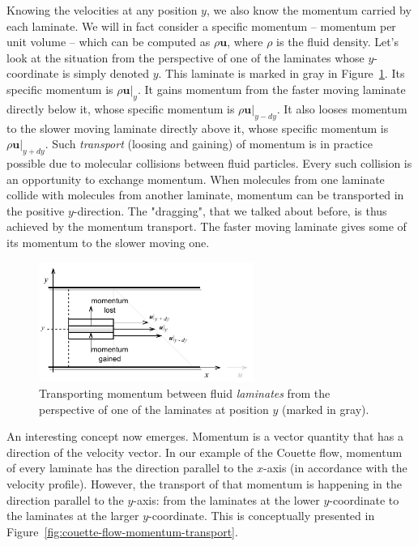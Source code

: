 \documentclass[10pt,twocolumn]{article}
\begin{document}
Knowing the velocities at any position $y$, we also know the momentum carried by each laminate. We will in fact consider a specific momentum -- momentum per unit volume -- which can be computed as $\rho \mathbf{u}$, where $\rho$ is the fluid density. Let's look at the situation from the perspective of one of the laminates whose $y$-coordinate is simply denoted $y$. This laminate is marked in gray in Figure~\ref{fig:momentum-transport-in-laminates}. Its specific momentum is $\rho \mathbf{u}|_{y}$. It gains momentum from the faster moving laminate directly below it, whose specific momentum is $\rho \mathbf{u}|_{y-dy}$. It also looses momentum to the slower moving laminate directly above it, whose specific momentum is $\rho \mathbf{u}|_{y+dy}$. Such \textit{transport} (loosing and gaining) of momentum is in practice possible due to molecular collisions between fluid particles. Every such collision is an opportunity to exchange momentum. When molecules from one laminate collide with molecules from another laminate, momentum can be transported in the positive $y$-direction. The "dragging", that we talked about before, is thus achieved by the momentum transport. The faster moving laminate gives some of its momentum to the slower moving one.

\begin{figure}[t!]
\centering\includegraphics[width=7cm]{momentum-transport-in-laminates.pdf}
\caption{Transporting momentum between fluid \textit{laminates} from the perspective of one of the laminates at position $y$ (marked in gray).}
\label{fig:momentum-transport-in-laminates}
\end{figure}



An interesting concept now emerges. Momentum is a vector quantity that has a direction of the velocity vector. In our example of the Couette flow, momentum of every laminate has the direction parallel to the $x$-axis (in accordance with the velocity profile). However, the transport of that momentum is happening in the direction parallel to the $y$-axis: from the laminates at the lower $y$-coordinate to the laminates at the larger $y$-coordinate. This is conceptually presented in Figure~\ref{fig:couette-flow-momentum-transport}. 
\end{document}
